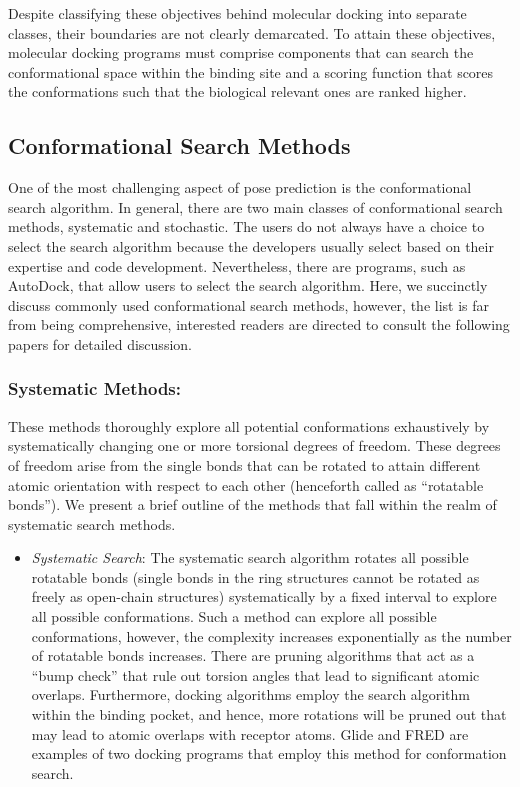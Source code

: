\documentclass[10pt,letterpaper]{article}
\begin{document}
{Despite classifying these objectives behind molecular docking into separate classes, their boundaries are not clearly demarcated. To attain these objectives, molecular docking programs must comprise components that can search the conformational space within the binding site and a scoring function that scores the conformations such that the biological relevant ones are ranked higher.


{\subsection*{Conformational Search Methods}
One of the most challenging aspect of pose prediction is the conformational search algorithm. In general, there are two main classes of conformational search methods, systematic and stochastic.  The users do not always have a choice to select the search algorithm because the developers usually select based on their expertise and code development. Nevertheless, there are programs, such as AutoDock\cite{bib22}, that allow users to select the search algorithm. Here, we succinctly discuss commonly used conformational search methods, however, the list is far from being comprehensive, interested readers are directed to consult the following papers for detailed discussion\cite{bib17, bib23}. 

\subsubsection*{Systematic Methods:}
These methods thoroughly explore all potential conformations exhaustively by systematically changing one or more torsional degrees of freedom. These degrees of freedom arise from the single bonds that can be rotated to attain different atomic orientation with respect to each other (henceforth called as “rotatable bonds”).  We present a brief outline of the methods that fall within the realm of systematic search methods.  
\begin{itemize}
    \item \textit{Systematic Search}: The systematic search algorithm\cite{bib14} rotates all possible rotatable bonds (single bonds in the ring structures cannot be rotated as freely as open-chain structures) systematically by a fixed interval to explore all possible conformations. Such a method can explore all possible conformations, however, the complexity increases exponentially as the number of rotatable bonds increases. There are pruning algorithms that act as a “bump check” that rule out torsion angles that lead to significant atomic overlaps. Furthermore, docking algorithms employ the search algorithm within the binding pocket, and hence, more rotations will be pruned out that 
    may lead to atomic overlaps with receptor atoms. Glide\cite{bib15} and FRED\cite{bib16} are examples of two docking programs that employ this method for conformation search. 


\end{itemize}}}
\end{document}
